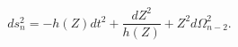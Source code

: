\begin{equation} \label{BHmetric}
ds^2_n=-h(Z)dt^2+\frac{dZ^2}{h(Z)}+Z^2 d \Omega_{n-2}^2.
\end{equation}

